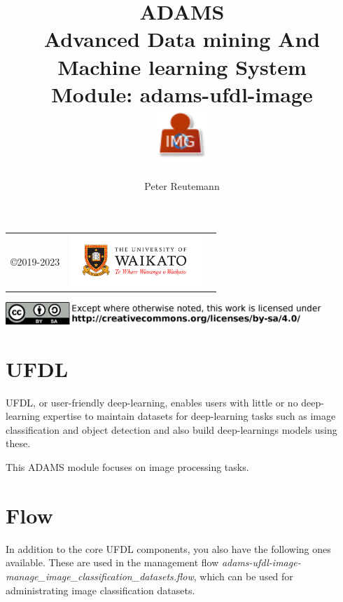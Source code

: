 \documentclass[a4paper]{book}
\title{
  \textbf{ADAMS} \\
  {\Large \textbf{A}dvanced \textbf{D}ata mining \textbf{A}nd \textbf{M}achine
  learning \textbf{S}ystem} \\
  {\Large Module: adams-ufdl-image} \\
  \vspace{1cm}
  \includegraphics[width=2cm]{images/ufdl-image-module.png} \\
}
\author{
  Peter Reutemann
}
\begin{document}
\begin{titlepage}
\maketitle

\thispagestyle{empty}
\center
\begin{table}[b]
	\begin{tabular}{c l l}
		\parbox[c][2cm]{2cm}{\copyright 2019-2023} &
		\parbox[c][2cm]{5cm}{\includegraphics[width=5cm]{images/coat_of_arms.pdf}} \\
	\end{tabular}
	\includegraphics[width=12cm]{images/cc.png} \\
\end{table}

\end{titlepage}

\tableofcontents

\chapter{UFDL}
UFDL, or user-friendly deep-learning, enables users with little or no deep-learning
expertise to maintain datasets for deep-learning tasks such as image classification
and object detection and also build deep-learnings models using these.

This ADAMS module focuses on image processing tasks.

\chapter{Flow}

In addition to the core UFDL components, you also have the following ones available.
These are used in the management flow \textit{adams-ufdl-image-manage\_image\_classification\_datasets.flow},
which can be used for administrating image classification datasets.
\end{document}
